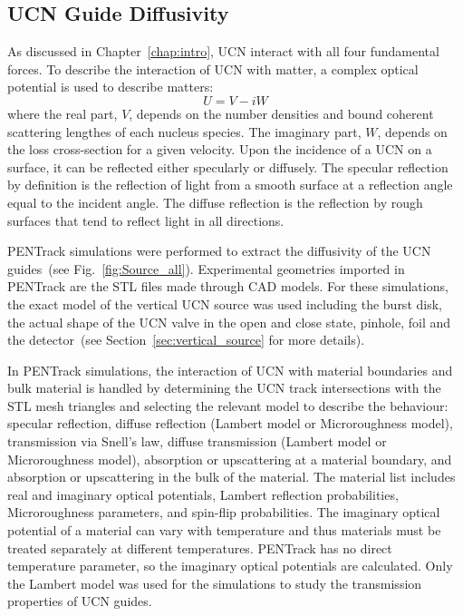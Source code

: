 \subsection{UCN Guide Diffusivity\label{sec:diffusivity}}
As discussed in Chapter~\ref{chap:intro}, UCN interact with all four
fundamental forces. To describe the interaction of UCN with matter, a
complex optical potential is used to describe matters:
\begin{equation}
  \label{eqn:fermipotential}
  U = V - iW
\end{equation}
where the real part, $V$, depends on the number densities and bound
coherent scattering lengthes of each nucleus species. The imaginary
part, $W$, depends on the loss cross-section for a given velocity.
Upon the incidence of a UCN on a surface, it can be reflected either
specularly or diffusely. The specular reflection by definition is the
reflection of light from a smooth surface at a reflection angle equal
to the incident angle. The diffuse reflection is the reflection by
rough surfaces that tend to reflect light in all directions.

PENTrack simulations were performed to extract the diffusivity of the
UCN guides~(see Fig.~\ref{fig:Source_all}). Experimental geometries
imported in PENTrack are the STL files made through CAD models. For
these simulations, the exact model of the vertical UCN source was used
including the burst disk, the actual shape of the UCN valve in the
open and close state, pinhole, foil and the detector~(see
Section~\ref{sec:vertical_source} for more details).



In PENTrack simulations, the interaction of UCN with material
boundaries and bulk material is handled by determining the UCN track
intersections with the STL mesh triangles and selecting the relevant
model to describe the behaviour: specular reflection, diffuse
reflection (Lambert model or Microroughness model), transmission via
Snell's law, diffuse transmission (Lambert model or Microroughness
model), absorption or upscattering at a material boundary, and
absorption or upscattering in the bulk of the material. The material
list includes real and imaginary optical potentials, Lambert
reflection probabilities, Microroughness parameters, and spin-flip
probabilities. The imaginary optical potential of a material can vary
with temperature and thus materials must be treated separately at
different temperatures. PENTrack has no direct temperature parameter,
so the imaginary optical potentials are calculated. Only the Lambert
model was used for the simulations to study the transmission
properties of UCN guides.


